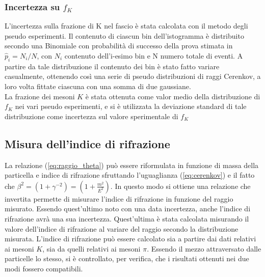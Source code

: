 \documentclass[8pt]{extarticle}
\begin{document}
\subsubsection{Incertezza su $f_K$} \label{subsub:pseudo}
L'incertezza sulla frazione di K nel fascio è stata calcolata con il metodo degli pseudo esperimenti. Il contenuto di ciascun bin dell'istogramma è distribuito secondo una Binomiale con probabilità di successo della prova stimata in $\hat{p}_i = N_{i}/N$, con $N_i$ contenuto dell'i-esimo bin e N numero totale di eventi. A partire da tale distribuzione il contenuto dei bin è stato fatto variare casualmente, ottenendo così una serie di pseudo distribuzioni di raggi Cerenkov, a loro volta fittate ciascuna con una somma di due gaussiane.\\
La frazione dei mesoni $K$ è stata ottenuta come valor medio della distribuzione di $f_K$ nei vari pseudo esperimenti, e si è utilizzata la deviazione standard di tale distribuzione come incertezza sul valore sperimentale di $f_K$

\subsection{Misura dell'indice di rifrazione}
La relazione (\eqref{eq:raggio_theta}) può essere riformulata in funzione di massa della particella e indice di rifrazione sfruttando l'uguaglianza (\eqref{eq:cerenkov}) e il fatto che $\beta^2=(1+\gamma^{-2})=(1+\frac{m^2}{E^2})$. In questo modo si ottiene una relazione che invertita permette di misurare l'indice di rifrazione in funzione del raggio misurato. Essendo quest'ultimo noto con una data incertezza, anche l'indice di rifrazione avrà una sua incertezza. Quest'ultima è stata calcolata misurando il valore dell'indice di rifrazione al variare del raggio secondo la distribuzione misurata. L'indice di rifrazione può essere calcolato sia a partire dai dati relativi ai mesoni $K$, sia da quelli relativi ai mesoni $\pi$. Essendo il mezzo attraversato dalle particelle lo stesso, si è controllato, per verifica, che i risultati ottenuti nei due modi fossero compatibili.
\end{document}
